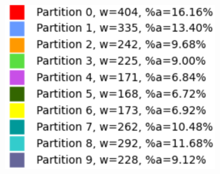 \begin{figure}[h]
\centering
\begin{subfigure}{.33\textwidth}
    \centering
    \caption[short]{}
\end{subfigure}%
\begin{subfigure}{.33\textwidth}
    \centering
    \caption[short]{}
\end{subfigure}%
\begin{subfigure}{.33\textwidth}
    \centering
    \includegraphics[width=0.9\linewidth]{images/results/m_k/with/9/results}

\end{subfigure}
\end{figure}
